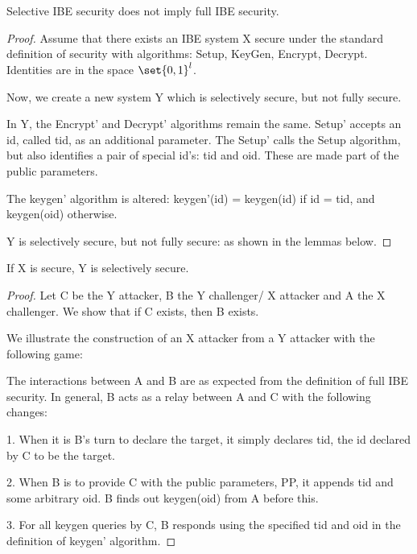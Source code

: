 \documentclass[10pt]{amsart}
\begin{document}
\section{}
\begin{thm}
 Selective IBE security does not imply full IBE security.
\end{thm}
\begin{proof}
 Assume that there exists an IBE system X secure under the standard definition of security with algorithms: Setup, KeyGen, Encrypt, Decrypt. Identities are in the space $\set{0,1}^{l}$.

Now, we create a new system Y which is selectively secure, but not fully secure.

In Y, the Encrypt' and Decrypt' algorithms remain the same. Setup' accepts an id, called tid, as an additional parameter. The Setup' calls the Setup algorithm, but also identifies a pair of special id's: tid and oid. These are made part of the public parameters.

The keygen' algorithm is altered: keygen'(id) = keygen(id) if id = tid, and keygen(oid) otherwise.

Y is selectively secure, but not fully secure: as shown in the lemmas below.

\end{proof}

\begin{lem}
If X is secure, Y is selectively secure.
\end{lem}
\begin{proof}
Let C be the Y attacker, B the Y challenger/ X attacker and A the X challenger. We show that if C exists, then B exists.

We illustrate the construction of an X attacker from a Y attacker with the following game:

The interactions between A and B are as expected from the definition of full IBE security. In general, B acts as a relay between A and C with the following changes:

1. When it is B's turn to declare the target, it simply declares tid, the id declared by C to be the target.

2. When B is to provide C with the public parameters, PP, it appends tid and some arbitrary oid. B finds out keygen(oid) from A before this.

3. For all keygen queries by C, B responds using the specified tid and oid in the definition of keygen' algorithm.

\end{proof}
\end{document}
